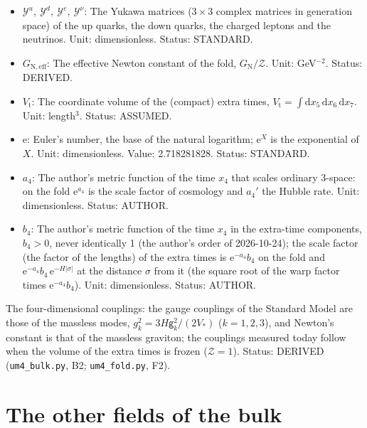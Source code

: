 \documentclass[
  10pt,
]{article}
\begin{document}
\begin{itemize}
  Unit: dimensionless. Status: DERIVED.
\item
  \(\mathcal{Y}^{u},\ \mathcal{Y}^{d},\ \mathcal{Y}^{e},\ \mathcal{Y}^{\nu}\):
  The Yukawa matrices (\(3 \times 3\) complex matrices in generation
  space) of the up quarks, the down quarks, the charged leptons and the
  neutrinos. Unit: dimensionless. Status: STANDARD.
\item
  \(G_{\mathrm{N,eff}}\): The effective Newton constant of the fold,
  \(G_{\mathrm{N}}/\mathcal{Z}\). Unit: GeV\(^{-2}\). Status: DERIVED.
\item
  \(V_{\mathrm{t}}\): The coordinate volume of the (compact) extra
  times,
  \(V_{\mathrm{t}} = \int\mathrm{d}x_5\,\mathrm{d}x_6\,\mathrm{d}x_7\).
  Unit: length\(^3\). Status: ASSUMED.
\item
  \(\mathrm{e}\): Euler's number, the base of the natural logarithm;
  \(\mathrm{e}^{X}\) is the exponential of \(X\). Unit: dimensionless.
  Value: 2.718281828. Status: STANDARD.
\item
  \(a_4\): The author's metric function of the time \(x_4\) that scales
  ordinary 3-space: on the fold \(\mathrm{e}^{a_4}\) is the scale factor
  of cosmology and \(a_4'\) the Hubble rate. Unit: dimensionless.
  Status: AUTHOR.
\item
  \(b_4\): The author's metric function of the time \(x_4\) in the
  extra-time components, \(b_4 > 0\), never identically 1 (the author's
  order of 2026-10-24); the scale factor (the factor of the lengths) of
  the extra times is \(\mathrm{e}^{-a_4}b_4\) on the fold and
  \(\mathrm{e}^{-a_4}b_4\,\mathrm{e}^{-H\lvert\sigma\rvert}\) at the
  distance \(\sigma\) from it (the square root of the warp factor times
  \(\mathrm{e}^{-a_4}b_4\)). Unit: dimensionless. Status: AUTHOR.
\end{itemize}

The four-dimensional couplings: the gauge couplings of the Standard
Model are those of the massless modes,
\(g_k^2 = 3H\mathsf{g}_k^2/(2V_*)\) (\(k = 1, 2, 3\)), and Newton's
constant is that of the massless graviton; the couplings measured today
follow when the volume of the extra times is frozen
(\(\mathcal{Z} = 1\)). Status: DERIVED (\texttt{um4\_bulk.py}, B2;
\texttt{um4\_fold.py}, F2).

\hypertarget{the-other-fields-of-the-bulk}{%
\section{The other fields of the
bulk}\label{the-other-fields-of-the-bulk}}
\end{document}
